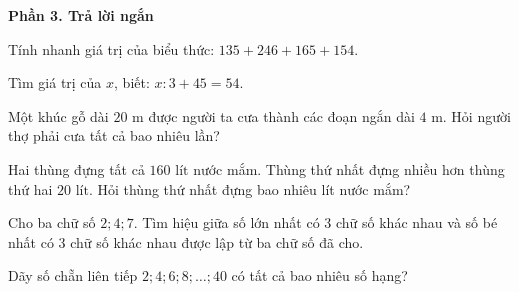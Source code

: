 \textbf{Phần 3. Trả lời ngắn}

\begin{ex} %
Tính nhanh giá trị của biểu thức: $135 + 246 + 165 + 154$.
\end{ex}

\begin{ex} %
Tìm giá trị của $x$, biết: $x : 3 + 45 = 54$.
\end{ex}

\begin{ex} %
Một khúc gỗ dài $20\text{ m}$ được người ta cưa thành các đoạn ngắn dài $4\text{ m}$. Hỏi người thợ phải cưa tất cả bao nhiêu lần?
\end{ex}

\begin{ex} %
Hai thùng đựng tất cả $160\text{ lít}$ nước mắm. Thùng thứ nhất đựng nhiều hơn thùng thứ hai $20\text{ lít}$. Hỏi thùng thứ nhất đựng bao nhiêu lít nước mắm?
\end{ex}

\begin{ex} %
Cho ba chữ số $2; 4; 7$. Tìm hiệu giữa số lớn nhất có 3 chữ số khác nhau và số bé nhất có 3 chữ số khác nhau được lập từ ba chữ số đã cho.
\end{ex}

\begin{ex} %
Dãy số chẵn liên tiếp $2; 4; 6; 8; \dots; 40$ có tất cả bao nhiêu số hạng?
\end{ex}
